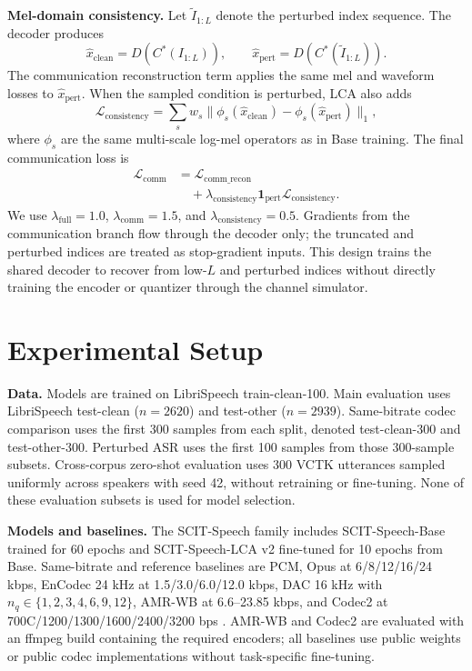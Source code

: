 \documentclass[10pt,twocolumn]{article}
\newcommand{\method}{SCIT-Speech}
\newcommand{\base}{SCIT-Speech-Base}
\newcommand{\lca}{SCIT-Speech-LCA}
\newcommand{\codebook}{C^\ast}
\begin{document}
\textbf{Mel-domain consistency.}
Let \(\tilde{I}_{1:L}\) denote the perturbed index sequence. The decoder produces
\[
\hat{x}_{\mathrm{clean}}=D(\codebook(I_{1:L})),\qquad
\hat{x}_{\mathrm{pert}}=D(\codebook(\tilde{I}_{1:L})).
\]
The communication reconstruction term applies the same mel and waveform losses to \(\hat{x}_{\mathrm{pert}}\). When the sampled condition is perturbed, LCA also adds
\[
\mathcal{L}_{\mathrm{consistency}} =
\sum_s w_s \|\phi_s(\hat{x}_{\mathrm{clean}})-\phi_s(\hat{x}_{\mathrm{pert}})\|_1,
\]
where \(\phi_s\) are the same multi-scale log-mel operators as in Base training. The final communication loss is
\[
\begin{aligned}
\mathcal{L}_{\mathrm{comm}} &=
\mathcal{L}_{\mathrm{comm\_recon}} \\
&\quad + \lambda_{\mathrm{consistency}}\mathbf{1}_{\mathrm{pert}}
\mathcal{L}_{\mathrm{consistency}} .
\end{aligned}
\]
We use \(\lambda_{\mathrm{full}}=1.0\), \(\lambda_{\mathrm{comm}}=1.5\), and \(\lambda_{\mathrm{consistency}}=0.5\). Gradients from the communication branch flow through the decoder only; the truncated and perturbed indices are treated as stop-gradient inputs. This design trains the shared decoder to recover from low-\(L\) and perturbed indices without directly training the encoder or quantizer through the channel simulator.

\section{Experimental Setup}

\textbf{Data.}
Models are trained on LibriSpeech train-clean-100. Main evaluation uses LibriSpeech test-clean (\(n=2620\)) and test-other (\(n=2939\)). Same-bitrate codec comparison uses the first 300 samples from each split, denoted test-clean-300 and test-other-300. Perturbed ASR uses the first 100 samples from those 300-sample subsets. Cross-corpus zero-shot evaluation uses 300 VCTK utterances sampled uniformly across speakers with seed 42, without retraining or fine-tuning. None of these evaluation subsets is used for model selection.

\textbf{Models and baselines.}
The \method{} family includes \base{} trained for 60 epochs and \lca{} v2 fine-tuned for 10 epochs from Base. Same-bitrate and reference baselines are PCM, Opus at 6/8/12/16/24 kbps, EnCodec 24 kHz at 1.5/3.0/6.0/12.0 kbps, DAC 16 kHz with \(n_q\in\{1,2,3,4,6,9,12\}\), AMR-WB at 6.6--23.85 kbps, and Codec2 at 700C/1200/1300/1600/2400/3200 bps \cite{valin2012opus,defossez2022encodec,kumar2023dac,itu2002amrwb,codec2repo}. AMR-WB and Codec2 are evaluated with an ffmpeg build containing the required encoders; all baselines use public weights or public codec implementations without task-specific fine-tuning.
\end{document}
